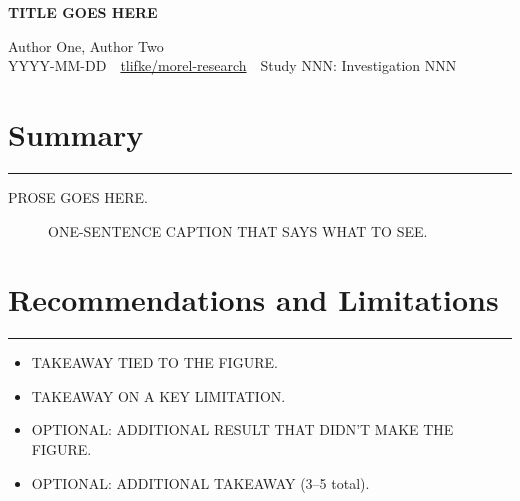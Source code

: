 \documentclass[10pt]{article}
\begin{document}
\begin{center}
{\Large\bfseries TITLE GOES HERE\par}
\vspace{0.4em}
Author One, Author Two\\[0.15em]
{\small YYYY-MM-DD \,\textbullet\, \href{https://github.com/tlifke/morel-research}{tlifke/morel-research} \,\textbullet\, Study NNN: Investigation NNN}
\end{center}
\vspace{0.8em}

\section*{Summary}
\vspace{-0.2em}
\hrule
\vspace{0.6em}
PROSE GOES HERE.

\begin{figure}[h]
  \centering
  \caption{ONE-SENTENCE CAPTION THAT SAYS WHAT TO SEE.}
\end{figure}

\section*{Recommendations and Limitations}
\vspace{-0.2em}
\hrule
\vspace{0.6em}
\begin{itemize}
  \item TAKEAWAY TIED TO THE FIGURE.
  \item TAKEAWAY ON A KEY LIMITATION.
  \item OPTIONAL: ADDITIONAL RESULT THAT DIDN'T MAKE THE FIGURE.
  \item OPTIONAL: ADDITIONAL TAKEAWAY (3--5 total).
\end{itemize}
\end{document}
